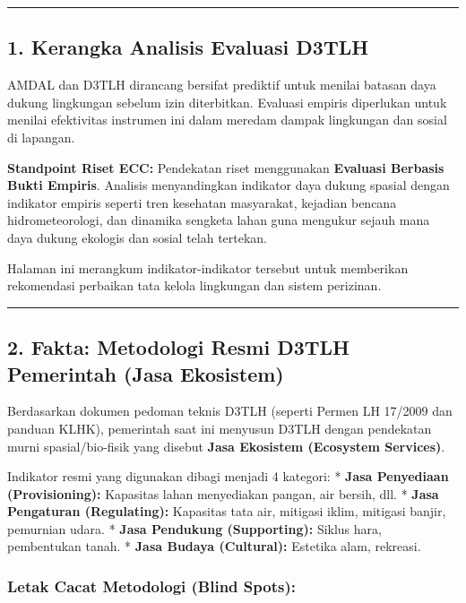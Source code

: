 \documentclass[
]{article}
\begin{document}
\begin{center}\rule{0.5\linewidth}{0.5pt}\end{center}

\subsection{1. Kerangka Analisis Evaluasi
D3TLH}\label{kerangka-analisis-evaluasi-d3tlh}

AMDAL dan D3TLH dirancang bersifat prediktif untuk menilai batasan daya
dukung lingkungan sebelum izin diterbitkan. Evaluasi empiris diperlukan
untuk menilai efektivitas instrumen ini dalam meredam dampak lingkungan
dan sosial di lapangan.

\textbf{Standpoint Riset ECC:} Pendekatan riset menggunakan
\textbf{Evaluasi Berbasis Bukti Empiris}. Analisis menyandingkan
indikator daya dukung spasial dengan indikator empiris seperti tren
kesehatan masyarakat, kejadian bencana hidrometeorologi, dan dinamika
sengketa lahan guna mengukur sejauh mana daya dukung ekologis dan sosial
telah tertekan.

Halaman ini merangkum indikator-indikator tersebut untuk memberikan
rekomendasi perbaikan tata kelola lingkungan dan sistem perizinan.

\begin{center}\rule{0.5\linewidth}{0.5pt}\end{center}

\subsection{2. Fakta: Metodologi Resmi D3TLH Pemerintah (Jasa
Ekosistem)}\label{fakta-metodologi-resmi-d3tlh-pemerintah-jasa-ekosistem}

Berdasarkan dokumen pedoman teknis D3TLH (seperti Permen LH 17/2009 dan
panduan KLHK), pemerintah saat ini menyusun D3TLH dengan pendekatan
murni spasial/bio-fisik yang disebut \textbf{Jasa Ekosistem (Ecosystem
Services)}.

Indikator resmi yang digunakan dibagi menjadi 4 kategori: * \textbf{Jasa
Penyediaan (Provisioning):} Kapasitas lahan menyediakan pangan, air
bersih, dll. * \textbf{Jasa Pengaturan (Regulating):} Kapasitas tata
air, mitigasi iklim, mitigasi banjir, pemurnian udara. * \textbf{Jasa
Pendukung (Supporting):} Siklus hara, pembentukan tanah. * \textbf{Jasa
Budaya (Cultural):} Estetika alam, rekreasi.

\subsubsection{Letak Cacat Metodologi (Blind
Spots):}\label{letak-cacat-metodologi-blind-spots}
\end{document}
